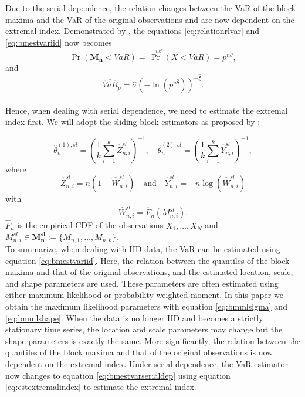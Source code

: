 \documentclass[a4paper,12pt]{article}
\theoremstyle{plain}
\begin{document}
Due to the serial dependence, the relation changes between the VaR of the block maxima and the VaR of the original observations and are now dependent on the extremal index. Demonstrated by , the equations \eqref{eq:relationrlvar} and \eqref{eq:bmestvariid} now becomes
\begin{equation}
    \Pr\left(\bm{M_n}<VaR\right)=\Pr^{\quad n\theta}\left(X<VaR\right)=p^{n\theta},
    \label{eq:relationrlvar2}
\end{equation}
\noindent and
\begin{equation}
    \widehat{VaR}_p = \hat{\sigma}\left(-\ln{\left(p^{n\hat{\theta}}\right)}\right)^{-\hat{\xi}}.
    \label{eq:bmestvarserialdep}
\end{equation}
\\
Hence, when dealing with serial dependence, we need to estimate the extremal index first. We will adopt the sliding block estimators as proposed by :

\begin{equation}
    \hat{\theta}^{(1),sl}_n=\left(\frac{1}{k}\sum^{k}_{i=1}\hat{Z}^{sl}_{n,i}\right)^{-1}, \quad \hat{\theta}^{(2),sl}_n=\left(\frac{1}{k}\sum^{k}_{i=1}\hat{Y}^{sl}_{n,i}\right)^{-1},
    \label{eq:estextremalindex}
\end{equation}
where 
\begin{equation*}
    \hat{Z}^{sl}_{n,i}=n\left(1-\hat{W}^{sl}_{n,i}\right) \quad \text{and} \quad \hat{Y}^{sl}_{n,i}=-n\log\left(\hat{W}^{sl}_{n,i}\right)
\end{equation*}
with
\begin{equation*}
    \hat{W}^{sl}_{n,i}=\hat{F}_n\left(M^{sl}_{n,i}\right).
\end{equation*}
$\hat{F}_n$ is the empirical CDF of the observations $X_1, \dots, X_N$ and $M^{sl}_{n,i} \in \bm{M^{sl}_{n}}:=\{M_{n,1}, \dots, M_{n,k}\}$.
\\

To summarize, when dealing with IID data, the VaR can be estimated using equation \eqref{eq:bmestvariid}. Here, the relation between the quantiles of the block maxima and that of the original observations, and the estimated location, scale, and shape parameters are used. These parameters are often estimated using either maximum likelihood or probability weighted moment. In this paper we obtain the maximum likelihood parameters with equation \eqref{eq:bmmlsigma} and \eqref{eq:bmmlshape}. When the data is no longer IID and becomes a strictly stationary time series, the location and scale parameters may change but the shape parameters is exactly the same. More significantly, the relation between the quantiles of the block maxima and that of the original observations is now dependent on the extremal index. Under serial dependence, the VaR estimator now changes to equation \eqref{eq:bmestvarserialdep} using equation \eqref{eq:estextremalindex} to estimate the extremal index.
\end{document}
